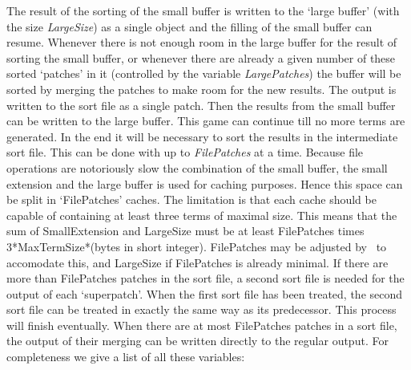 The result of the sorting of the small buffer is written to the 
`large buffer' (with the size {\sl 
LargeSize}) as a single object and the filling of the 
small buffer can resume. Whenever there is not enough room in the large 
buffer for the result of sorting the small buffer, or whenever there are 
already a given number of these sorted `patches' in it (controlled by the 
variable {\sl LargePatches}) the buffer will be sorted 
by merging the patches to make room for the new results. The 
output is written to the sort file as a single patch. Then the results from 
the small buffer can be written to the large buffer. This game can continue 
till no more terms are generated. In the end it will be necessary to sort 
the results in the intermediate sort file. This can be 
done with up to {\sl FilePatches} at a time. Because 
file operations are notoriously slow the combination of the small buffer, 
the small extension and the large buffer is used for caching 
purposes. Hence this space can be split in `FilePatches' caches. The 
limitation is that each cache should be capable of containing at least 
three terms of maximal size. This means that the sum of SmallExtension
and LargeSize must be at least FilePatches times 3*MaxTermSize*(bytes in 
short integer). FilePatches may be adjusted by \FORM\ to accomodate this,
and LargeSize if FilePatches is already minimal.
If there are more than
FilePatches patches in the sort file, a second sort file is needed for the 
output of each `superpatch'. When the first sort file has 
been treated, the second sort file can be treated in exactly the same way 
as its predecessor. This process will finish eventually. When there are at 
most FilePatches patches in a sort file, the output of their merging can be 
written directly to the regular output. For completeness we give a list of 
all these variables:



